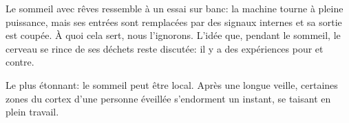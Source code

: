 Le sommeil avec rêves ressemble à un essai sur banc: la machine tourne à pleine puissance, mais ses entrées sont remplacées par des signaux internes et sa sortie est coupée. À quoi cela sert, nous l'ignorons. L'idée que, pendant le sommeil, le cerveau se \og rince\fg{} de ses déchets reste discutée: il y a des expériences pour et contre.

Le plus étonnant: le sommeil peut être local. Après une longue veille, certaines zones du cortex d'une personne éveillée \og s'endorment\fg{} un instant, se taisant en plein travail.

